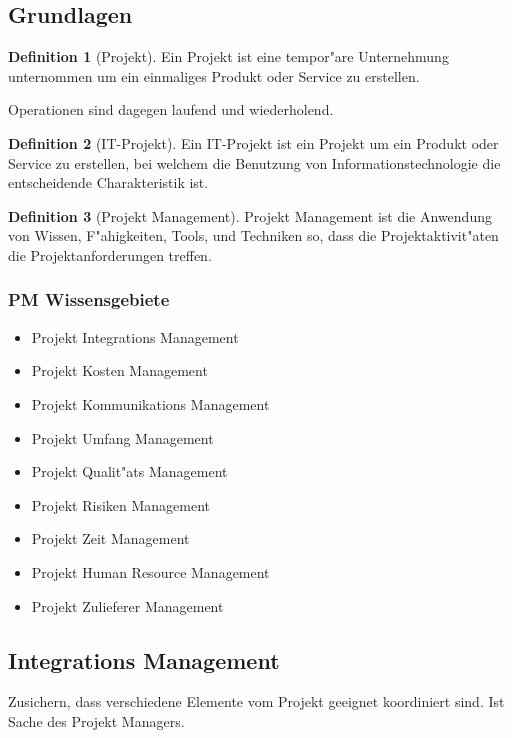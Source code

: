 \documentclass[german, 10pt, a4paper, twocolumn]{scrartcl}
\theoremstyle{definition}
\newtheorem*{definition}{Definition}
\begin{document}
\subsection{Grundlagen}

\begin{definition}[Projekt]
	Ein Projekt ist eine tempor"are Unternehmung unternommen um ein einmaliges Produkt oder Service zu erstellen.
\end{definition}

Operationen sind dagegen laufend und wiederholend.

\begin{definition}[IT-Projekt]
	Ein IT-Projekt ist ein Projekt um ein Produkt oder Service zu erstellen, bei welchem die Benutzung von Informationstechnologie die entscheidende Charakteristik ist.
\end{definition}

\begin{definition}[Projekt Management]
	Projekt Management ist die Anwendung von Wissen, F"ahigkeiten, Tools, und Techniken so, dass die Projektaktivit"aten die Projektanforderungen treffen.
\end{definition}

\subsubsection{PM Wissensgebiete}

\begin{itemize}
	\item Projekt Integrations Management
	\item Projekt Kosten Management
	\item Projekt Kommunikations Management
	\item Projekt Umfang Management
	\item Projekt Qualit"ats Management
	\item Projekt Risiken Management
	\item Projekt Zeit Management
	\item Projekt Human Resource Management
	\item Projekt Zulieferer Management
\end{itemize}

\subsection{Integrations Management}

Zusichern, dass verschiedene Elemente vom Projekt geeignet koordiniert sind. Ist Sache des Projekt Managers.
\end{document}
